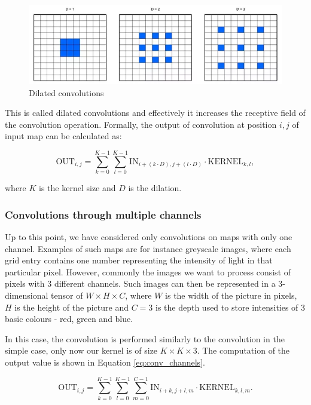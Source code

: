 \begin{figure}
    \centering
    \includegraphics[width=\linewidth]{imgs_andy/dilated_conv.png}
    \caption{Dilated convolutions}
    \label{fig:dilated_conv}
\end{figure}

This is called dilated convolutions and effectively it increases the receptive field of the convolution operation.
Formally, the output of convolution at position $i, j$ of input map can be calculated as:

\begin{equation}
    \text{OUT}_{i,j} = \sum_{k=0}^{K-1} \sum_{l=0}^{K-1} \text{IN}_{i+(k \cdot D),j+(l \cdot D)} \cdot \text{KERNEL}_{k, l},
\end{equation}

where $K$ is the kernel size and $D$ is the dilation.

\subsubsection{Convolutions through multiple channels}
Up to this point, we have considered only convolutions on maps with only one channel.
Examples of such maps are for instance greyscale images, where each grid entry contains one number representing the intensity of light in that particular pixel.
However, commonly the images we want to process consist of pixels with 3 different channels.
Such images can then be represented in a 3-dimensional tensor of $W \times H \times C$, where $W$ is the width of the picture in pixels, $H$ is the height of the picture and $C=3$ is the depth used to store intensities of 3 basic colours - red, green and blue. 

In this case, the convolution is performed similarly to the convolution in the simple case, only now our kernel is of size $K \times K \times 3$.
The computation of the output value is shown in Equation \ref{eq:conv_channels}.

\begin{equation}
    \text{OUT}_{i,j} = \sum_{k=0}^{K-1} \sum_{l=0}^{K-1} \sum_{m=0}^{C-1} 
        \text{IN}_{i+k,j+l, m} \cdot \text{KERNEL}_{k, l, m}.
    \label{eq:conv_channels}
\end{equation}

